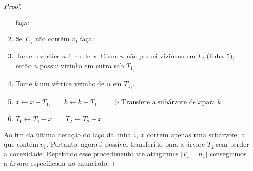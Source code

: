 \documentclass[11pt,a4paper,notitlepage]{exam}
\newcommand\Recebe{\leftarrow}
\newcommand\Comment{\vartriangleright}
\begin{document}
\begin{proof}
\begin{enumerate}
            faça:
        \item \hspace*{40px} Se $T_{1_i}$ não contém $v_1$ faça:
        \item \hspace*{60px} Tome o vértice $u$ filho de $x$.
            Como $u$ não possui vizinhos em $T_2$ (linha 5), então
            $u$ possui vizinho em outra sub
            $T_{1_j}$.
        \item \hspace*{60px} Tome $k$ um vértice
            vizinho de $u$ em $T_{1_j}$.
        \item \hspace*{60px} $x \Recebe x -T_{1_i} \qquad k \Recebe k +
            T_{1_1}\qquad \Comment \text{Transfere a subárvore de $x$
            para $k$}$
        \item \hspace*{40px} $T_1 \Recebe T_1 -x \qquad T_2 \Recebe
            T_2 + x$
    \end{enumerate}

    Ao fim da última iteração do laço da linha 9, $x$ contém apenas
    uma subárvore: a que contém $v_1$. Portanto, agora é possível
    transferi-lo para a árvore $T_2$ sem perder a conexidade.
    Repetindo esse procedimento até atingirmos $|V_1 = n_1|$
    conseguimos a árvore específicada no enunciado.
\end{proof}
\end{document}

